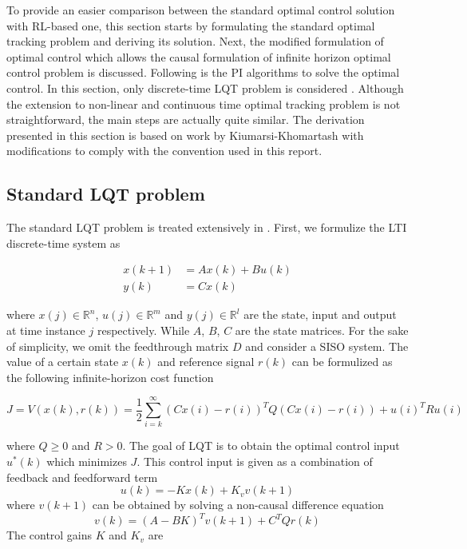 To provide an easier comparison between the standard optimal control solution with \ac{RL}-based one, this section starts by formulating the standard optimal tracking problem and deriving its solution. Next, the modified formulation of optimal control which allows the causal formulation of infinite horizon optimal control problem is discussed. Following is the \ac{PI} algorithms to solve the optimal control. In this section, only discrete-time \ac{LQT} problem is considered \cite{Kiumarsi6760476}. Although the extension to non-linear and continuous time optimal tracking problem is not straightforward, the main steps are actually quite similar. The derivation presented in this section is based on work by Kiumarsi-Khomartash \cite{Kiumarsi6760476} with modifications to comply with the convention used in this report.

\subsection{Standard LQT problem}
The standard \ac {LQT} problem is treated extensively in \cite{lewis1995optimal}. First, we formulize the \ac {LTI} discrete-time system as 

\begin{equation} \label{eq:ss}
\begin{split}
x(k+1) &= Ax(k) + Bu(k) \\
y(k) &= Cx(k)
\end{split}
\end{equation}

where $x(j) \in \mathbb{R}^n$, $u(j) \in \mathbb{R}^m$ and $y(j) \in \mathbb{R}^l$ are the state, input and output at time instance $j$ respectively. While $A$, $B$, $C$ are the state matrices. For the sake of simplicity, we omit the feedthrough matrix $D$ and consider a \ac {SISO} system. The value of a certain state $x(k)$ and reference signal $r(k)$ can be formulized as the following infinite-horizon cost function

\begin{equation}
\label{eq:infcost}
J = V(x(k), r(k)) = \frac{1}{2} \sum_{i=k}^{\infty} (Cx(i)-r(i))^TQ(Cx(i)-r(i)) + u(i)^TRu(i)
\end{equation}

where $Q \geq 0$ and $R > 0$. The goal of LQT is to obtain the optimal control input $u^*(k)$ which minimizes $J$. This control input is given as a combination of feedback and feedforward term
\begin{equation}
u(k) = -Kx(k) + K_vv(k+1)
\end{equation}
where $v(k+1)$ can be obtained by solving a non-causal difference equation
\begin{equation}
v(k) = (A-BK)^Tv(k+1) + C^TQr(k)
\label{eq:noncausal}
\end{equation}
The control gains $K$ and $K_v$ are

